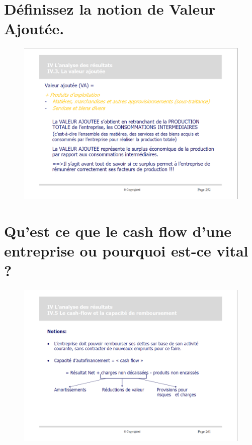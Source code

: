 \documentclass{article}
\begin{document}
\section{Définissez la notion de Valeur Ajoutée.}
\begin{figure}[H]
	\centering
	\includegraphics[width=14cm]{va.png}
\end{figure}
\section{Qu’est ce que le cash flow d’une entreprise ou pourquoi est-ce vital ?}
\begin{figure}[H]
	\centering
	\includegraphics[width=14cm]{cashflow.png}
\end{figure}
\printbibliography
\end{document}
